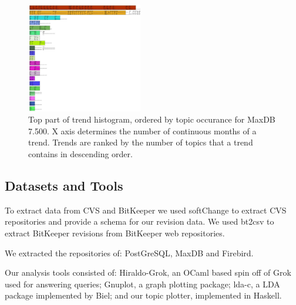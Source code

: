 \documentclass[times, 10pt,twocolumn]{article}
\begin{document}
\begin{figure}
  \centering
  \includegraphics[width=0.45\textwidth]{histogram-cropped-scaled}
  \caption{Top part of trend histogram, ordered by topic occurance for MaxDB 7.500. X axis determines the number of continuous months of a trend. Trends are ranked  by the number of topics that a trend contains in descending order.}       
  \label{fig:histogram}
\end{figure}


\subsection{Datasets and Tools}

To extract data from CVS and BitKeeper we used softChange to extract
CVS repositories and provide a schema for our revision data. We used
bt2csv to extract BitKeeper revisions from BitKeeper web repositories.

We extracted the repositories of: PostGreSQL, MaxDB and
Firebird.


Our analysis tools consisted of: Hiraldo-Grok, an OCaml based spin off
of Grok used for answering queries; Gnuplot, a graph plotting package;
lda-c, a LDA package implemented by Biel; and our topic plotter,
implemented in Haskell.




\end{document}
